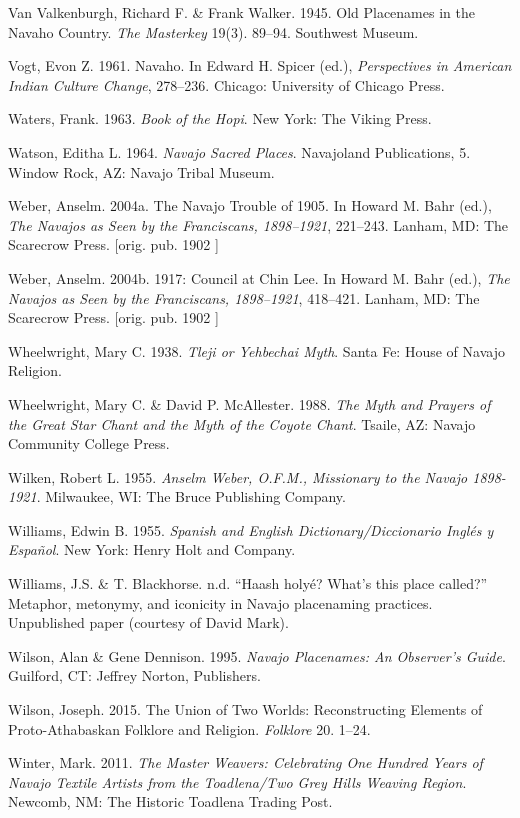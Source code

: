 \begin{hang}
	Van Valkenburgh, Richard F. \& Frank Walker. 1945.  Old Placenames in the Navaho Country.  \textit{The Masterkey} 19(3). 89--94.  Southwest Museum.

	Vogt, Evon Z.  1961.  Navaho. In Edward H. Spicer (ed.),  \textit{Perspectives in American Indian Culture Change}, 278--236.  Chicago:  University of Chicago Press.

	Waters, Frank. 1963.  \textit{Book of the Hopi}.  New York:  The Viking Press.

	Watson, Editha L. 1964.  \textit{Navajo Sacred Places}.  Navajoland Publications, 5.  Window Rock, AZ:  Navajo Tribal Museum.

	Weber, Anselm. 2004a.  The Navajo Trouble of 1905.  In Howard M. Bahr (ed.), \textit{The Navajos as Seen by the Franciscans, 1898--1921}, 221--243.  Lanham, MD:  The Scarecrow Press.  [orig. pub. 1902 ]

	Weber, Anselm. 2004b.  1917: Council at Chin Lee. In Howard M. Bahr (ed.), \textit{The Navajos as Seen by the Franciscans, 1898--1921}, 418--421.  Lanham, MD:  The Scarecrow Press.  [orig. pub. 1902 ]

	Wheelwright, Mary C.  1938.  \textit{Tleji or Yehbechai Myth}.  Santa Fe:  House of Navajo Religion.

	Wheelwright, Mary C. \& David P. McAllester. 1988. \textit{The Myth and Prayers of the Great Star Chant and the Myth of the Coyote Chant}.  Tsaile, AZ:  Navajo Community College Press.

	Wilken, Robert L. 1955.  \textit{Anselm Weber, O.F.M., Missionary to the Navajo 1898-1921}.  Milwaukee, WI:  The Bruce Publishing Company.

	Williams, Edwin B. 1955.  \textit{Spanish and English Dictionary/Diccionario Inglés y Español}.  New York:  Henry Holt and Company.

	Williams, J.S. \& T. Blackhorse. n.d. ``Haash holyé? What's this place called?'' Metaphor, metonymy, and iconicity in Navajo placenaming practices. Unpublished paper (courtesy of David Mark).

	Wilson, Alan \& Gene Dennison. 1995.  \textit{Navajo Placenames: An Observer’s Guide}.  Guilford, CT:  Jeffrey Norton, Publishers.

	Wilson, Joseph. 2015. The Union of Two Worlds: Reconstructing Elements of Proto-Athabaskan Folklore and Religion.  \textit{Folklore} 20. 1--24.

	Winter, Mark. 2011. \textit{The Master Weavers: Celebrating One Hundred Years of Navajo Textile Artists from the Toadlena/Two Grey Hills Weaving Region}.  Newcomb, NM:  The Historic Toadlena Trading Post.


\end{hang}
